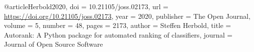 \documentclass[12pt, letterpaper, twoside]{report}
\begin{document}
@article{Herbold2020,
  doi = {10.21105/joss.02173},
  url = {\url{https://doi.org/10.21105/joss.02173}},
  year = {2020},
  publisher = {The Open Journal},
  volume = {5},
  number = {48},
  pages = {2173},
  author = {Steffen Herbold},
  title = {Autorank: A Python package for 
  automated ranking of classifiers},
  journal = {Journal of Open Source Software}
}

 
\end{document}
